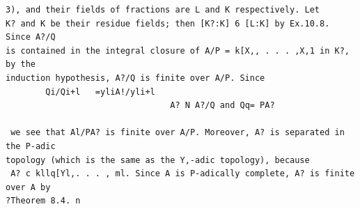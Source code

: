 \begin{theorem}\label{mcrt-auto-theorem-11-2}\uses{}
\begin{verbatim}
3), and their fields of fractions are L and K respectively. Let
K? and K be their residue fields; then [K?:K] 6 [L:K] by Ex.10.8. Since A?/Q
is contained in the integral closure of A/P = k[X,, . . . ,X,1 in K?, by the
induction hypothesis, A?/Q is finite over A/P. Since
        Qi/Qi+l   =yliA!/yli+l
                                 A? N A?/Q and Qq= PA?

 we see that Al/PA? is finite over A/P. Moreover, A? is separated in the P-adic
topology (which is the same as the Y,-adic topology), because
 A? c kllq[Yl,. . . , ml. Since A is P-adically complete, A? is finite over A by
?Theorem 8.4. n


\end{verbatim}
\end{theorem}
